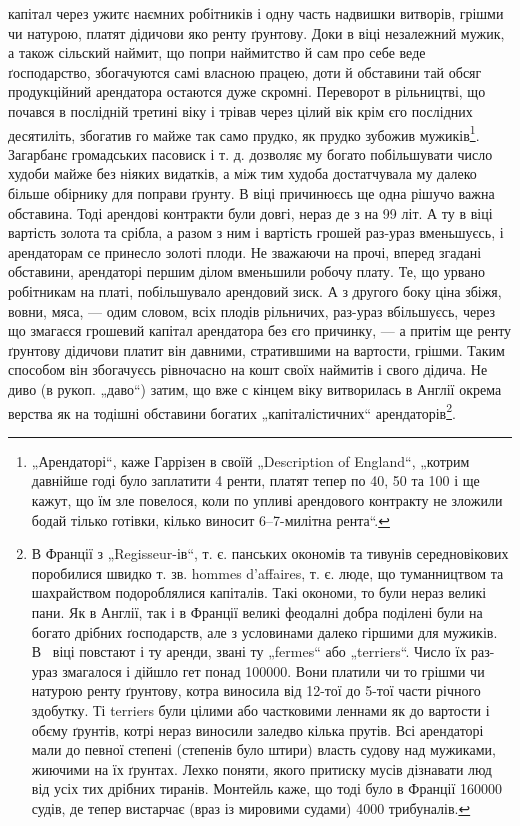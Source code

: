 \parcont{}
капітал через ужитє наємних робітників і одну часть надвишки витворів, грішми чи натурою, платят
дідичови яко ренту ґрунтову. Доки в  віці незалежний мужик, а також сільский наймит, що попри
наймитство й сам про себе веде ґосподарство, збогачуются самі власною працею, доти й обставини тай
обсяг продукційний арендатора остаются дуже скромні. Переворот в рільництві, що почався в послідній
третині  віку і трівав через цілий  вік крім єго послідних десятиліть, збогатив го майже так
само прудко, як прудко зубожив мужиків\footnote{
„Арендаторі“, каже Гаррізен в своїй „Description of England“, „котрим давнійше годі було
заплатити 4 ренти, платят тепер по 40, 50 та 100 і ще кажут, що їм зле повелося, коли
по упливі арендового контракту не зложили бодай тілько готівки, кілько виносит 6--7-милітна рента“.
}. Загарбанє громадських пасовиск і т. д. дозволяє му
богато побільшувати число худоби майже без ніяких видатків, а між тим худоба достатчувала му далеко
більше обірнику для поправи ґрунту. В  віці причинюєсь ще одна рішучо важна обставина. Тоді
арендові контракти були довгі, нераз де з на 99 літ. А ту в  віці вартість золота та срібла, а
разом з ним і вартість грошей раз-ураз вменьшуєсь, і арендаторам се принесло золоті плоди. Не
зважаючи на прочі, вперед згадані обставини, арендаторі першим ділом вменьшили робочу плату. Те, що
урвано робітникам на платі, побільшувало
арендовий зиск. А з другого боку ціна збіжя, вовни, мяса, — одим словом, всіх плодів рільничих,
раз-ураз вбільшуєсь, через що змагаєся грошевий капітал арендатора
без єго причинку, — а притім ще ренту ґрунтову дідичови платит він давними, стратившими на вартости,
грішми. Таким способом він збогачуєсь рівночасно на кошт своїх наймитів і свого дідича. Не диво (в
рукоп. „даво“) затим, що вже с кінцем  віку витворилась в Англії окрема верства як на тодішні
обставини богатих „капіталістичних“ арендаторів\footnote{
В Франції з „Regisseur-ів“, т. є. панських окономів та тивунів середновікових поробилися швидко
т. зв. hommes d'affaires, т. є. люде, що туманництвом та шахрайством подороблялися капіталів. Такі
окономи, то були нераз великі пани. Як в Англії, так і в Франції великі феодалні добра поділені були
на богато дрібних ґосподарств, але з условинами далеко гіршими для мужиків. В~ віці повстают і ту
аренди, звані ту „fermes“ або „terriers“. Число їх раз-ураз змагалося і дійшло гет понад
\num{100000}. Вони платили чи то грішми чи натурою ренту ґрунтову, котра виносила від 12-тої до 5-тої
части річного здобутку. Ті terriers були цілими або частковими леннами як до вартости і обєму
ґрунтів, котрі нераз виносили заледво кілька прутів. Всі арендаторі мали до певної степені (степенів
було штири) власть судову над мужиками, жиючими
на їх ґрунтах. Лехко поняти, якого притиску мусів дізнавати люд від
усіх тих дрібних тиранів. Монтейль каже, що тоді було в Франції \num{160000}
судів, де тепер вистарчає (враз із мировими судами) 4000 трибуналів.
}.

